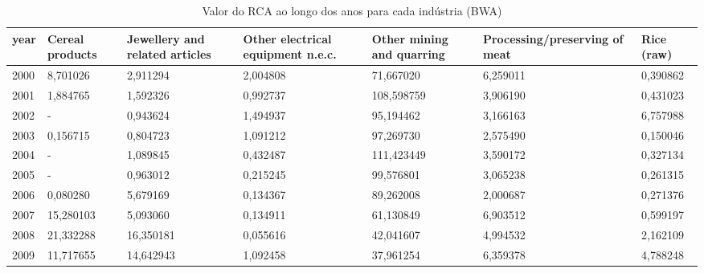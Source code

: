 \begin{table}
\centering
\caption{Valor do RCA ao longo dos anos para cada indústria (BWA)}
\begin{tabular}{p{1cm}p{2cm}p{2cm}p{2cm}p{2cm}p{2cm}p{2cm}}
\toprule
 year &  Cereal products &  Jewellery and related articles &  Other electrical equipment n.e.c. &  Other mining and quarring &  Processing/preserving of meat &  Rice (raw) \\
\midrule
 2000 &         8,701026 &                        2,911294 &                           2,004808 &                  71,667020 &                       6,259011 &    0,390862 \\
 2001 &         1,884765 &                        1,592326 &                           0,992737 &                 108,598759 &                       3,906190 &    0,431023 \\
 2002 &                - &                        0,943624 &                           1,494937 &                  95,194462 &                       3,166163 &    6,757988 \\
 2003 &         0,156715 &                        0,804723 &                           1,091212 &                  97,269730 &                       2,575490 &    0,150046 \\
 2004 &                - &                        1,089845 &                           0,432487 &                 111,423449 &                       3,590172 &    0,327134 \\
 2005 &                - &                        0,963012 &                           0,215245 &                  99,576801 &                       3,065238 &    0,261315 \\
 2006 &         0,080280 &                        5,679169 &                           0,134367 &                  89,262008 &                       2,000687 &    0,271376 \\
 2007 &        15,280103 &                        5,093060 &                           0,134911 &                  61,130849 &                       6,903512 &    0,599197 \\
 2008 &        21,332288 &                       16,350181 &                           0,055616 &                  42,041607 &                       4,994532 &    2,162109 \\
 2009 &        11,717655 &                       14,642943 &                           1,092458 &                  37,961254 &                       6,359378 &    4,788248 \\

\end{tabular}
\end{table}
